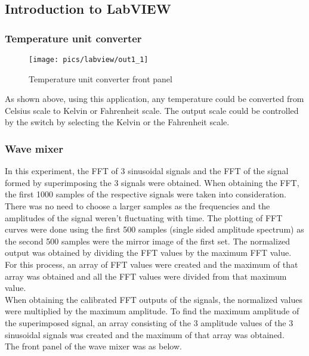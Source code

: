 \subsection{Introduction to LabVIEW}

\subsubsection{Temperature unit converter}

\begin{figure}[!h]
	\centering
	\texttt{[image: pics/labview/out1\_1]}
	\caption{Temperature unit converter front panel}
	\label{fig:out11}
\end{figure}

\noindent
As shown above, using this application, any temperature could be converted from Celsius scale to Kelvin or Fahrenheit scale. The output scale could be controlled by the switch by selecting the Kelvin or the Fahrenheit scale.


\subsubsection{Wave mixer}

\noindent
In this experiment, the FFT of 3 sinusoidal signals and the FFT of the signal formed by superimposing the 3 signals were obtained. When obtaining the FFT, the first 1000 samples of the respective signals were taken into consideration. There was no need to choose a larger samples as the frequencies and the amplitudes of the signal weren't fluctuating  with time. The plotting of FFT curves were done using the first 500 samples (single sided amplitude spectrum) as the second 500 samples were the mirror image of the first set. The normalized output was obtained by dividing the FFT values by the maximum FFT value. For this process, an array of FFT values were created and the maximum of that array was obtained and all the FFT values were divided from that maximum value. \\

\noindent
When obtaining the calibrated FFT outputs of the signals, the normalized values were multiplied by the maximum amplitude. To find the maximum amplitude of the superimposed signal, an array consisting of the 3 amplitude values of the 3 sinusoidal signals was created and the maximum of that array was obtained. \\

\noindent
The front panel of the wave mixer was as below.

